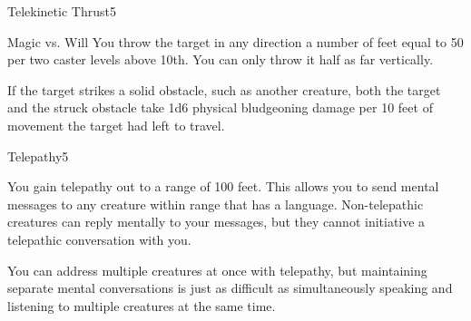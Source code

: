 \begin{spellsection}{Telekinetic Thrust}{5}
\begin{spellheader}
    \begin{spelltargetinginfo}
    \end{spelltargetinginfo}
\end{spellheader}
\begin{spellcontent}
    \begin{spelleffects}
        \begin{spellattack}{Magic vs. Will}
            \spellsuccess You throw the target in any direction a number of feet equal to 50  per two caster levels above 10th. You can only throw it half as far vertically.

            If the target strikes a solid obstacle, such as another creature, both the target and the struck obstacle take 1d6 physical bludgeoning damage per 10 feet of movement the target had left to travel.
        \end{spellattack}
    \end{spelleffects}
\end{spellcontent}
\begin{spellfooter}
\end{spellfooter}
\end{spellsection}

\begin{spellsection}{Telepathy}{5}
\begin{spellheader}
    \begin{spelltargetinginfo}
    \end{spelltargetinginfo}
\end{spellheader}
\begin{spellcontent}
    \begin{spelleffects}
        \spelleffect You gain telepathy out to a range of 100 feet. This allows you to send mental messages to any creature within range that has a language. Non-telepathic creatures can reply mentally to your messages, but they cannot initiative a telepathic conversation with you.

        You can address multiple creatures at once with telepathy, but maintaining separate mental conversations is just as difficult as simultaneously speaking and listening to multiple creatures at the same time. 
        \spelldur \durlong
    \end{spelleffects}
\end{spellcontent}
\begin{spellfooter}
\end{spellfooter}
\end{spellsection}

